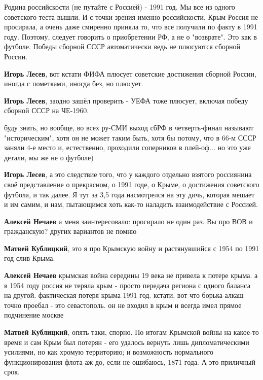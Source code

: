 \begin{itemize}
\begin{itemize} %

Родина российскости (не путайте с Россией) - 1991 год. Мы все из одного
советского теста вышли. И с точки зрения именно российскости, Крым Россия не
просирала, а очень даже смиренно приняла то, что все получили по факту в 1991
году. Поэтому, следует говорить о приобретении РФ, а не о "возврате". Это как в
футболе. Победы сборной СССР автоматически ведь не плюсуются сборной России.

\textbf{Игорь Лесев}, вот кстати ФИФА плюсует советские достижения сборной России, иногда с пометками, иногда без, но плюсует.

\textbf{Игорь Лесев}, заодно зашёл проверить - УЕФА тоже плюсует, включая победу сборной СССР на ЧЕ-1960.


буду знать, но вообще, во всех ру-СМИ выход сбРФ в четверть-финал называют
"историческим", хотя он не может таким быть, хотя бы потому, что в 66-м СССР
заняли 4-е место и, естественно, проходили соперников в плей-оф... но это уже
детали, мы же не о футболе) 

\textbf{Игорь Лесев}, а это следствие того, что у каждого отдельно взятого россиянина своё представление о прекрасном, о 1991 годе, о Крыме, о достижения советского футбола, и так далее.
Я тут за 3,5 года насмотрелся на эту дичь, которая мешает и им самим, и нам, пытающимся хоть как-то наладить взаимодействие с Россией.

\textbf{Алексей Нечаев} а меня заинтересовало: просирало не один раз. Вы про ВОВ и гражданскую? других вариантов не помню

\textbf{Матвей Кублицкий}, это я про Крымскую войну и растянувшийся с 1954 по 1991 год слив Крыма.

\textbf{Алексей Нечаев} крымская война середины 19 века не привела к потере крыма. а в 1954 году россия не теряла крым - просто передача региона с одного баланса на другой. фактическая потеря крыма 1991 год. кстати, вот что борька-алкаш точно проебал - это севастополь. он не входил в крым и всегда имел прямое подчинение москве

\textbf{Матвей Кублицкий}, опять таки, спорно. По итогам Крымской войны на какое-то время и сам Крым был потерян - его удалось вернуть лишь дипломатическими усилиями, но как хромую территорию; и возможность нормального функционирования флота аж до, если не ошибаюсь, 1871 года. А это приличный срок.


\end{itemize}
\end{itemize}
